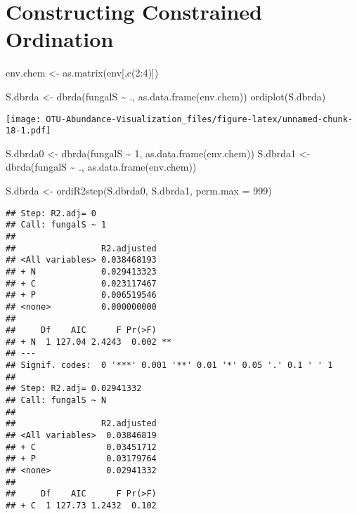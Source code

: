\documentclass[
]{article}
\newenvironment{Shaded}{\begin{snugshade}}{\end{snugshade}}
\newcommand{\AttributeTok}[1]{\textcolor[rgb]{0.77,0.63,0.00}{#1}}
\newcommand{\DecValTok}[1]{\textcolor[rgb]{0.00,0.00,0.81}{#1}}
\newcommand{\FunctionTok}[1]{\textcolor[rgb]{0.00,0.00,0.00}{#1}}
\newcommand{\NormalTok}[1]{#1}
\newcommand{\OtherTok}[1]{\textcolor[rgb]{0.56,0.35,0.01}{#1}}
\newcommand{\SpecialCharTok}[1]{\textcolor[rgb]{0.00,0.00,0.00}{#1}}
\begin{document}
\hypertarget{constructing-constrained-ordination}{%
\section{Constructing Constrained
Ordination}\label{constructing-constrained-ordination}}

\begin{Shaded}
\begin{Highlighting}[]
\NormalTok{env.chem }\OtherTok{\textless{}{-}} \FunctionTok{as.matrix}\NormalTok{(env[,}\FunctionTok{c}\NormalTok{(}\DecValTok{2}\SpecialCharTok{:}\DecValTok{4}\NormalTok{)])}


\NormalTok{S.dbrda }\OtherTok{\textless{}{-}} \FunctionTok{dbrda}\NormalTok{(fungalS }\SpecialCharTok{\textasciitilde{}}\NormalTok{ ., }\FunctionTok{as.data.frame}\NormalTok{(env.chem))}
\FunctionTok{ordiplot}\NormalTok{(S.dbrda)}
\end{Highlighting}
\end{Shaded}

\texttt{[image: OTU-Abundance-Visualization\_files/figure-latex/unnamed-chunk-18-1.pdf]}

\begin{Shaded}
\begin{Highlighting}[]
\NormalTok{S.dbrda0 }\OtherTok{\textless{}{-}} \FunctionTok{dbrda}\NormalTok{(fungalS }\SpecialCharTok{\textasciitilde{}} \DecValTok{1}\NormalTok{, }\FunctionTok{as.data.frame}\NormalTok{(env.chem))}
\NormalTok{S.dbrda1 }\OtherTok{\textless{}{-}} \FunctionTok{dbrda}\NormalTok{(fungalS }\SpecialCharTok{\textasciitilde{}}\NormalTok{ ., }\FunctionTok{as.data.frame}\NormalTok{(env.chem))}

\NormalTok{S.dbrda }\OtherTok{\textless{}{-}} \FunctionTok{ordiR2step}\NormalTok{(S.dbrda0, S.dbrda1, }\AttributeTok{perm.max =} \DecValTok{999}\NormalTok{)}
\end{Highlighting}
\end{Shaded}

\begin{verbatim}
## Step: R2.adj= 0 
## Call: fungalS ~ 1 
##  
##                 R2.adjusted
## <All variables> 0.038468193
## + N             0.029413323
## + C             0.023117467
## + P             0.006519546
## <none>          0.000000000
## 
##     Df    AIC      F Pr(>F)   
## + N  1 127.04 2.4243  0.002 **
## ---
## Signif. codes:  0 '***' 0.001 '**' 0.01 '*' 0.05 '.' 0.1 ' ' 1
## 
## Step: R2.adj= 0.02941332 
## Call: fungalS ~ N 
##  
##                 R2.adjusted
## <All variables>  0.03846819
## + C              0.03451712
## + P              0.03179764
## <none>           0.02941332
## 
##     Df    AIC      F Pr(>F)
## + C  1 127.73 1.2432  0.102
\end{verbatim}
\end{document}
